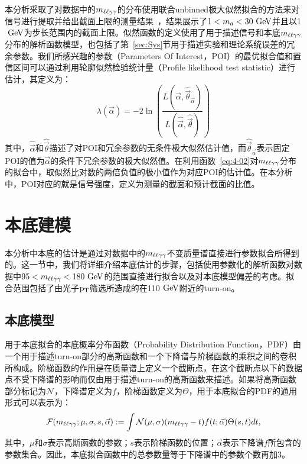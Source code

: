 本分析采取了对数据中的$m_{\ell\ell\gamma\gamma}$的分布使用联合unbinned极大似然拟合的方法来对信号进行提取并给出截面上限的测量结果~\cite{likelihoodRatio}，结果展示了$1<\ma<30\GeV$并且以1$\GeV$为步长范围内的截面上限。似然函数的定义使用了用于描述信号和本底$m_{\ell\ell\gamma\gamma}$分布的解析函数模型，也包括了第~\ref{sec:Sys}节用于描述实验和理论系统误差的冗余参数。我们所感兴趣的参数（Parameters Of Interest，POI）的最优拟合值和置信区间可以通过利用轮廓似然检验统计量（Profile likelihood test statistic）进行估计，其定义为：
\begin{equation}\label{eq:4-02}
    \lambda(\vec{\alpha})=-2 \ln \left(\frac{L(\vec{\alpha}, \hat{\vec{\theta}}_{\vec{\alpha}})}{L(\hat{\vec{\alpha}}, \hat{\vec{\theta}})}\right)
\end{equation}
其中，$\hat{\vec{\alpha}}$和$\hat{\vec{\theta}}$描述了对POI和冗余参数的无条件极大似然估计值，而$\hat{\vec{\theta}}_{\vec{\alpha}}$表示固定POI的值为$\vec{\alpha}$的条件下冗余参数的极大似然值。在利用函数~\ref{eq:4-02}对$m_{\ell\ell\gamma\gamma}$分布的拟合中，取似然比对数的两倍负值的极小值作为对应POI的估计值。在本分析中，POI对应的就是信号强度，定义为测量的截面和预计截面的比值。

\section{本底建模}\label{sec:Bkg}

本分析中本底的估计是通过对数据中的$m_{\ell\ell\gamma\gamma}$不变质量谱直接进行参数拟合所得到的。这一节中，我们将详细介绍本底估计的步骤，包括使用参数化的解析函数对数据中$95<\mllgg<180\GeV$的范围直接进行拟合以及对本底模型偏差的考虑。拟合范围包括了由光子$\mathrm{p_{T}}$筛选所造成的在110$\GeV$附近的turn-on。

\subsection{本底模型}

用于本底拟合的本底概率分布函数（Probability Distribution Function，PDF）由一个用于描述turn-on部分的高斯函数和一个下降谱与阶梯函数的乘积之间的卷积所构成。阶梯函数的作用是在质量谱上定义一个截断点，在这个截断点以下的数据点不受下降谱的影响而仅由用于描述turn-on的高斯函数来描述。如果将高斯函数部分标记为$\mathcal{N}$，下降谱定义为$f$，阶梯函数定义为$\Theta$，用于本底拟合的PDF的通用形式可以表示为：
\begin{equation}\label{eq:4-03}
  \mathcal{F}(m_{\ell\ell\gamma\gamma};\mu,\sigma,s,\vec{\alpha}) := \int\mathcal{N}(\mu,\sigma)(m_{\ell\ell\gamma\gamma}-t)f(t;\vec{\alpha})\Theta(s,t)dt,
\end{equation}
其中，$\mu$和$\sigma$表示高斯函数的参数；$s$表示阶梯函数的位置；$\vec{\alpha}$表示下降谱$f$所包含的参数集合。因此，本底拟合函数中的总参数量等于下降谱中的参数个数再加3。

